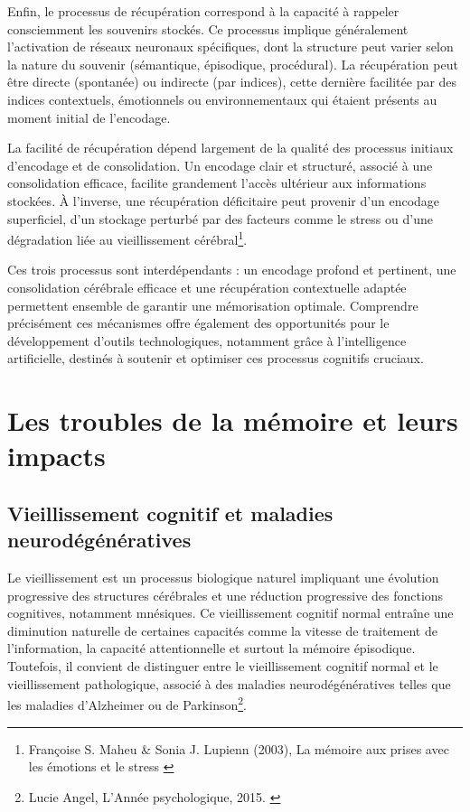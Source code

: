\documentclass[11pt,a4paper]{report}
\begin{document}
Enfin, le processus de récupération correspond à la capacité à rappeler consciemment les souvenirs stockés. Ce processus implique généralement l'activation de réseaux neuronaux spécifiques, dont la structure peut varier selon la nature du souvenir (sémantique, épisodique, procédural). La récupération peut être directe (spontanée) ou indirecte (par indices), cette dernière facilitée par des indices contextuels, émotionnels ou environnementaux qui étaient présents au moment initial de l'encodage.

La facilité de récupération dépend largement de la qualité des processus initiaux d'encodage et de consolidation. Un encodage clair et structuré, associé à une consolidation efficace, facilite grandement l'accès ultérieur aux informations stockées. À l’inverse, une récupération déficitaire peut provenir d’un encodage superficiel, d’un stockage perturbé par des facteurs comme le stress ou d'une dégradation liée au vieillissement cérébral\footnote{Françoise S. Maheu \& Sonia J. Lupienn (2003), La mémoire aux prises avec les émotions et le stress \cite{maheulupienn}}.

Ces trois processus sont interdépendants : un encodage profond et pertinent, une consolidation cérébrale efficace et une récupération contextuelle adaptée permettent ensemble de garantir une mémorisation optimale. Comprendre précisément ces mécanismes offre également des opportunités pour le développement d'outils technologiques, notamment grâce à l’intelligence artificielle, destinés à soutenir et optimiser ces processus cognitifs cruciaux.

\section{Les troubles de la mémoire et leurs impacts}

\subsection{Vieillissement cognitif et maladies neurodégénératives}

Le vieillissement est un processus biologique naturel impliquant une évolution progressive des structures cérébrales et une réduction progressive des fonctions cognitives, notamment mnésiques. Ce vieillissement cognitif normal entraîne une diminution naturelle de certaines capacités comme la vitesse de traitement de l'information, la capacité attentionnelle et surtout la mémoire épisodique. Toutefois, il convient de distinguer entre le vieillissement cognitif normal et le vieillissement pathologique, associé à des maladies neurodégénératives telles que les maladies d’Alzheimer ou de Parkinson\footnote{Lucie Angel, L'Année psychologique, 2015. \cite{angel}}.
\end{document}
